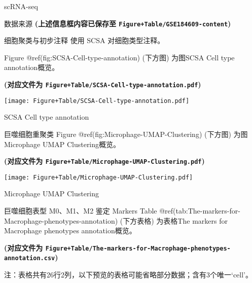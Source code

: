 \documentclass[
  ignorenonframetext,
]{beamer}
\begin{document}
\begin{frame}[fragile]{scRNA-seq}
\begin{block}{数据来源}
\textbf{(上述信息框内容已保存至
\texttt{Figure+Table/GSE184609-content})}
\end{block}

\begin{block}{细胞聚类与初步注释}
\protect\hypertarget{ux7ec6ux80deux805aux7c7bux4e0eux521dux6b65ux6ce8ux91ca}{}
使用 SCSA 对细胞类型注释。

Figure @ref(fig:SCSA-Cell-type-annotation) (下方图) 为图SCSA Cell type
annotation概览。

\textbf{(对应文件为
\texttt{Figure+Table/SCSA-Cell-type-annotation.pdf})}

\def\@captype{figure}
\begin{center}
\texttt{[image: Figure+Table/SCSA-Cell-type-annotation.pdf]}
\caption{SCSA Cell type annotation}\label{fig:SCSA-Cell-type-annotation}
\end{center}
\end{block}

\begin{block}{巨噬细胞重聚类}
\protect\hypertarget{ux5de8ux566cux7ec6ux80deux91cdux805aux7c7b}{}
Figure @ref(fig:Microphage-UMAP-Clustering) (下方图) 为图Microphage UMAP
Clustering概览。

\textbf{(对应文件为
\texttt{Figure+Table/Microphage-UMAP-Clustering.pdf})}

\def\@captype{figure}
\begin{center}
\texttt{[image: Figure+Table/Microphage-UMAP-Clustering.pdf]}
\caption{Microphage UMAP Clustering}\label{fig:Microphage-UMAP-Clustering}
\end{center}
\end{block}

\begin{block}{巨噬细胞表型 M0、M1、M2 鉴定 Markers}
\protect\hypertarget{ux5de8ux566cux7ec6ux80deux8868ux578b-m0m1m2-ux9274ux5b9a-markers}{}
Table @ref(tab:The-markers-for-Macrophage-phenotypes-annotation)
(下方表格) 为表格The markers for Macrophage phenotypes annotation概览。

\textbf{(对应文件为
\texttt{Figure+Table/The-markers-for-Macrophage-phenotypes-annotation.csv})}

\begin{center}\begin{tcolorbox}[colback=gray!10, colframe=gray!50, width=0.9\linewidth, arc=1mm, boxrule=0.5pt]注：表格共有26行2列，以下预览的表格可能省略部分数据；含有3个唯一`cell'。
\end{tcolorbox}
\end{center}


\end{block}
\end{frame}
\end{document}
